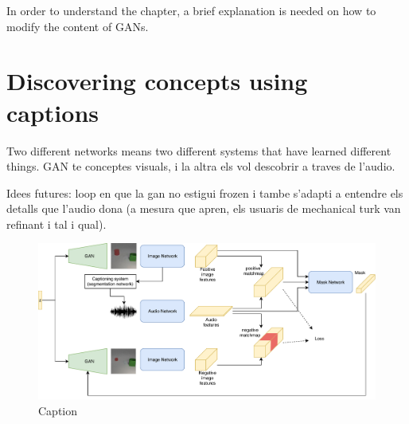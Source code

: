 In order to understand the chapter, a brief explanation is needed on how to modify the content of GANs.

\section{Discovering concepts using captions}

Two different networks means two different systems that have learned different things. GAN te conceptes visuals, i la altra els vol descobrir a traves de l'audio.

Idees futures: loop en que la gan no estigui frozen i tambe s'adapti a entendre els detalls que l'audio dona (a mesura que apren, els usuaris de mechanical turk van refinant i tal i qual).
\begin{figure}
    \includegraphics[width=1\linewidth]{figures/GANsandaudio.pdf}
    \caption[Caption]{Caption}
    \label{fig:ganaudio}
\end{figure}
